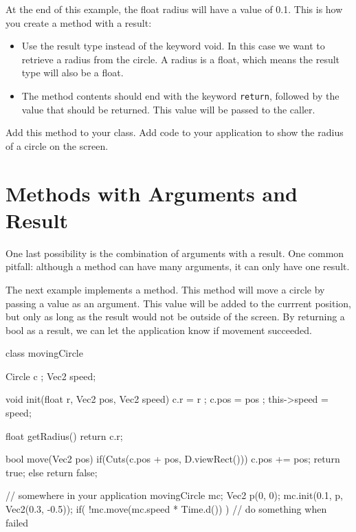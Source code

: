 At the end of this example, the float radius will have a value of 0.1. This is how you create a method with a result:

\begin{itemize}
\item Use the result type instead of the keyword void. In this case we want to retrieve a radius from the circle. A radius is a float, which means the result type will also be a float.
\item The method contents should end with the keyword \texttt{return}, followed by the value that should be returned. This value will be passed to the caller.
\end{itemize}

\begin{exercise}
Add this method to your class. Add code to your application to show the radius of a circle on the screen.
\end{exercise}

\section{Methods with Arguments and Result}
One last possibility is the combination of arguments with a result. One common pitfall: although a method can have many arguments, it can only have one result.

The next example implements a  method. This method will move a circle by passing a value as an argument. This value will be added to the currrent position, but only as long as the result would not be outside of the screen. By returning a bool as a result, we can let the application know if movement succeeded.

\begin{code}
class movingCircle {
  Circle c    ;
  Vec2   speed;
  
  void init(float r, Vec2 pos, Vec2 speed) {
    c.r         = r    ;
    c.pos       = pos  ;
    this->speed = speed;
  }
  
  float getRadius() {
    return c.r;
  }
  
  bool move(Vec2 pos) {
    if(Cuts(c.pos + pos, D.viewRect())) {
      c.pos += pos;
      return true;
    } else {
      return false;
    }
  }
}

// somewhere in your application
movingCircle mc;
Vec2 p(0, 0);
mc.init(0.1, p, Vec2(0.3, -0.5));
if( !mc.move(mc.speed * Time.d()) ) {
  // do something when failed
}
\end{code}

